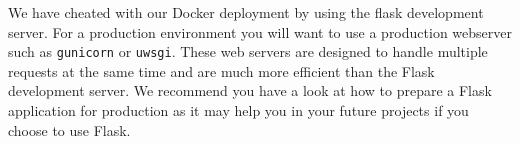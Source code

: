 \documentclass{csse4400}
\begin{document}
We have cheated with our Docker deployment by using the flask development server.
For a production environment you will want to use a production webserver such as \texttt{gunicorn} or \texttt{uwsgi}.
These web servers are designed to handle multiple requests at the same time and are much more efficient than the Flask development server.
We recommend you have a look at how to prepare a Flask application for production as it may help you in your future projects if you choose to use Flask.

%
%
\end{document}
